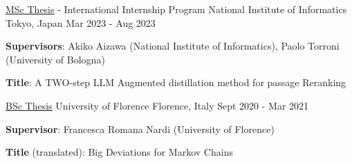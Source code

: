 

\begin{cventries}

  \cventry
    {\href{https://amslaurea.unibo.it/30082/}{\underline{MSc Thesis}} - International Internship Program} %
    {National Institute of Informatics} %
    {Tokyo, Japan} %
    {Mar 2023 - Aug 2023} %
    {
      \begin{cvitems} %
        \item {\textbf{Supervisors}: Akiko Aizawa (National Institute of Informatics), Paolo Torroni (University of Bologna)} 
        \item {\textbf{Title}: A TWO-step LLM Augmented distillation method for passage Reranking}
      \end{cvitems}
    }

  \cventry
    {\href{https://github.com/Freddavide/Freddavide/blob/main/elaborato_B036_Baldelli_Davide.pdf}{\underline{BSc Thesis}}} %
    {University of Florence} %
    {Florence, Italy} %
    {Sept 2020 - Mar 2021} %
    {
      \begin{cvitems} %
        \item {\textbf{Supervisor}: Francesca Romana Nardi (University of Florence)}
        \item {\textbf{Title} (translated): Big Deviations for Markov Chains}
      \end{cvitems}
    }



\end{cventries}

